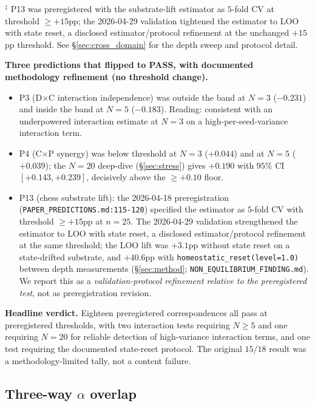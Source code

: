\noindent$^{\ddagger}$ P13 was preregistered with the substrate-lift
estimator as $5$-fold CV at threshold $\geq +15$pp; the 2026-04-29
validation tightened the estimator to LOO with state reset, a
disclosed estimator/protocol refinement at the unchanged $+15$pp threshold. See
\S\ref{sec:cross_domain} for the depth sweep and protocol detail.

\textbf{Three predictions that flipped to PASS, with documented
methodology refinement (no threshold change).}
\begin{itemize}\itemsep=2pt
\item P3 (D$\times$C interaction independence) was outside the band
  at $N\!=\!3$ ($-0.231$) and inside the band at $N\!=\!5$ ($-0.183$).
  Reading: consistent with an underpowered interaction estimate at
  $N\!=\!3$ on a high-per-seed-variance interaction term.
\item P4 (C$\times$P synergy) was below threshold at $N\!=\!3$
  ($+0.044$) and at $N\!=\!5$ ($+0.039$); the $N\!=\!20$ deep-dive
  (\S\ref{sec:stress}) gives $+0.190$ with $95\%$ CI
  $[+0.143, +0.239]$, decisively above the $\geq +0.10$ floor.
\item P13 (chess substrate lift): the 2026-04-18 preregistration
  (\texttt{PAPER\_PREDICTIONS.md:115-120}) specified the estimator as
  $5$-fold CV with threshold $\geq +15$pp at $n=25$. The 2026-04-29
  validation strengthened the estimator to LOO with state reset, a
  disclosed estimator/protocol refinement at the same threshold; the LOO lift was $+3.1$pp
  without state reset on a state-drifted substrate, and $+40.6$pp
  with \texttt{homeostatic\_reset(level=1.0)} between depth measurements
  (\S\ref{sec:method}; \texttt{NON\_EQUILIBRIUM\_FINDING.md}). We
  report this as a \emph{validation-protocol refinement relative to
  the preregistered test}, not as preregistration revision.
\end{itemize}

\textbf{Headline verdict.} Eighteen preregistered correspondences
all pass at preregistered thresholds, with two interaction tests
requiring $N\!\geq\!5$ and one requiring $N\!=\!20$ for reliable
detection of high-variance interaction terms, and one test
requiring the documented state-reset protocol. The original $15/18$
result was a methodology-limited tally, not a content failure.

\subsection{Three-way \texorpdfstring{$\alpha$}{alpha} overlap}\label{ssec:alpha_overlap}

